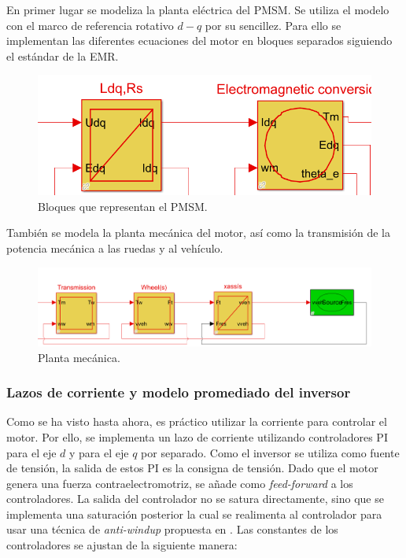 En primer lugar se modeliza la planta eléctrica del PMSM. Se utiliza el modelo con el marco de referencia rotativo $d-q$ por su sencillez. Para ello se implementan las diferentes ecuaciones del motor en bloques separados siguiendo el estándar de la EMR.

\begin{figure}[H]
    \centering
    \includegraphics[width=0.7\linewidth]{fig/motorEMR1.png}
    \caption{Bloques que representan el PMSM.}
\end{figure}

También se modela la planta mecánica del motor, así como la transmisión de la potencia mecánica a las ruedas y al vehículo.

\begin{figure}[H]
    \centering
    \includegraphics[width=0.95\linewidth]{fig/carEMR.png}
    \caption{Planta mecánica.}
\end{figure}

\subsubsection{Lazos de corriente y modelo promediado del inversor}

Como se ha visto hasta ahora, es práctico utilizar la corriente para controlar el motor. Por ello, se implementa un lazo de corriente utilizando controladores PI para el eje $d$ y para el eje $q$ por separado. Como el inversor se utiliza como fuente de tensión, la salida de estos PI es la consigna de tensión. Dado que el motor genera una fuerza contraelectromotriz, se añade como \textit{feed-forward} a los controladores. La salida del controlador no se satura directamente, sino que se implementa una saturación posterior la cual se realimenta al controlador para usar una técnica de \textit{anti-windup} propuesta en \cite{chandana2002}. Las constantes de los controladores se ajustan de la siguiente manera:

